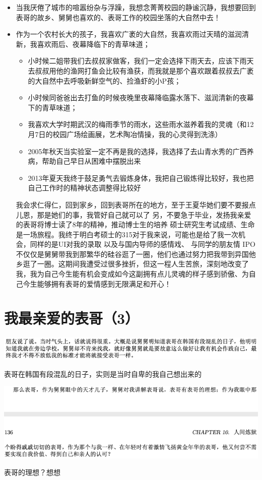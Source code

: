 \documentclass[9pt, b5paper]{article}
\begin{document}
\begin{itemize}
\item 当我厌倦了城市的喧嚣纷杂与浮躁，我想念菁菁校园的静谧沉静，我想要回到表哥的故乡、舅舅也喜欢的、表哥工作的校园坐落的大自然中去！
\item 作为一个农村长大的孩子，我喜欢广袤的大自然，我喜欢雨过天晴的滋润清新，我喜欢雨后、夜幕降临下的青草味道；
\begin{itemize}
\item 小时候二姐带我们去叔叔家做客，我们一定会选择下雨天去，应该下雨天去叔叔用他的渔网打鱼会比较有渔获，而我就是那个喜欢跟着叔叔去广袤的大自然中去呼吸新鲜空气的、捡渔虾的小P孩；
\item 小时候同爸爸出去打鱼的时候夜晚里夜幕降临露水落下、滋润清新的夜幕下的青草味道；
\item 我喜欢大学时期武汉的梅雨季节的雨水，这些雨水滋养着我的灵魂（和12月7日的校园广场绘画展，艺术陶冶情操，我的心灵得到洗涤）
\item 2005年秋天当实验室一定不再是我的选择，我选择了去山青水秀的广西养病，帮助自己早日从困难中摆脱出来
\item 2013年夏天我终于鼓足勇气去锻炼身体，我把自己锻炼得比较好，我也把自己工作时的精神状态调整得比较好
\end{itemize}

我会求仁得仁，回到家乡，回到表哥所在的地方，至于王夏华她们要不要报点儿恩，那是她们的事，我管好自己就可以了
另，不要急于毕业，发扬我亲爱的表哥将博士读了8年的精神，推动博士生的培养
硕士研究生考试成绩、生命是一场旅程。我终于明白考硕士的315对于我来说，可能也是给了我一次机会，同样的是UI对我的录取
以及与国内导师的感情戏、
与同学的朋友情
IPO 
不仅仅是舅舅带我到那繁华的硅谷逛了一圈，他们也通过努力把我带到异国他乡逛了一圈。这期间我遭受过很多挫折，但这一程人生苦旅，深刻地改变了我，我为自己今生能有机会变成如今这副拥有点儿灵魂的样子感到骄傲、为自己今生能够拥有表哥的爱情感到无限满足和开心！
\end{itemize}

\section{我最亲爱的表哥（3）}
\label{sec:org0351ec5}
\begin{center}
\includegraphics[width=.9\linewidth]{./pic/p1p49-3.png}
\end{center}
表哥在韩国有段混乱的日子，实则是当时自卑的我自己想出来的
\begin{center}
\includegraphics[width=.9\linewidth]{./pic/p1p135-05.png}
\end{center}
表哥的理想？想想
\end{document}
